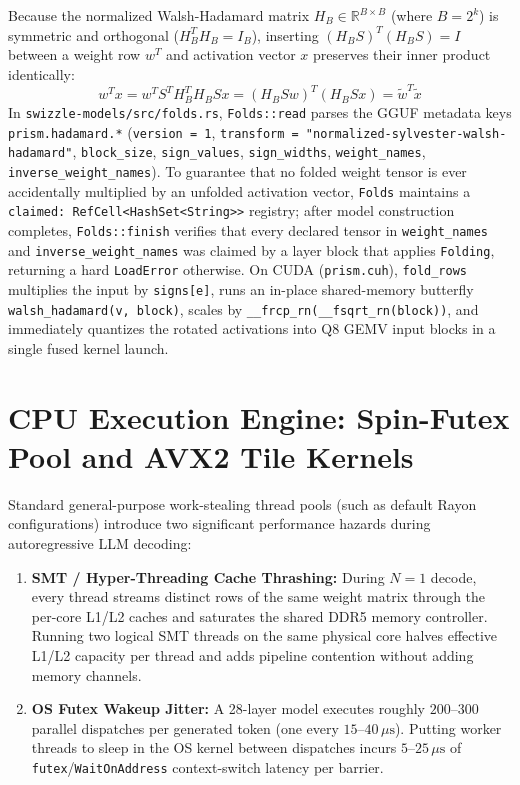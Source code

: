 \documentclass[10pt,a4paper]{article}
\theoremstyle{swzstyle}
\newcommand{\code}[1]{\texttt{#1}}
\begin{document}
Because the normalized Walsh-Hadamard matrix $H_B \in \mathbb{R}^{B \times B}$ (where $B = 2^k$) is symmetric and orthogonal ($H_B^T H_B = I_B$), inserting $(H_B S)^T (H_B S) = I$ between a weight row $w^T$ and activation vector $x$ preserves their inner product identically:
\begin{equation}
  w^T x = w^T S^T H_B^T H_B S x = (H_B S w)^T (H_B S x) = \tilde{w}^T \tilde{x}
\end{equation}
In \code{swizzle-models/src/folds.rs}, \code{Folds::read} parses the GGUF metadata keys \code{prism.hadamard.*} (\code{version = 1}, \code{transform = "normalized-sylvester-walsh-hadamard"}, \code{block\_size}, \code{sign\_values}, \code{sign\_widths}, \code{weight\_names}, \code{inverse\_weight\_names}). To guarantee that no folded weight tensor is ever accidentally multiplied by an unfolded activation vector, \code{Folds} maintains a \code{claimed: RefCell<HashSet<String>>} registry; after model construction completes, \code{Folds::finish} verifies that every declared tensor in \code{weight\_names} and \code{inverse\_weight\_names} was claimed by a layer block that applies \code{Folding}, returning a hard \code{LoadError} otherwise. On CUDA (\code{prism.cuh}), \code{fold\_rows} multiplies the input by \code{signs[e]}, runs an in-place shared-memory butterfly \code{walsh\_hadamard(v, block)}, scales by \code{\_\_frcp\_rn(\_\_fsqrt\_rn(block))}, and immediately quantizes the rotated activations into $\text{Q8}$ GEMV input blocks in a single fused kernel launch.

\section{CPU Execution Engine: Spin-Futex Pool and AVX2 Tile Kernels}

Standard general-purpose work-stealing thread pools (such as default Rayon configurations) introduce two significant performance hazards during autoregressive LLM decoding:
\begin{enumerate}
  \item \textbf{SMT / Hyper-Threading Cache Thrashing:} During $N=1$ decode, every thread streams distinct rows of the same weight matrix through the per-core L1/L2 caches and saturates the shared DDR5 memory controller. Running two logical SMT threads on the same physical core halves effective L1/L2 capacity per thread and adds pipeline contention without adding memory channels.
  \item \textbf{OS Futex Wakeup Jitter:} A 28-layer model executes roughly $200\text{--}300$ parallel dispatches per generated token (one every $15\text{--}40\,\mu\text{s}$). Putting worker threads to sleep in the OS kernel between dispatches incurs $5\text{--}25\,\mu\text{s}$ of \code{futex}/\code{WaitOnAddress} context-switch latency per barrier.
\end{enumerate}
\end{document}
